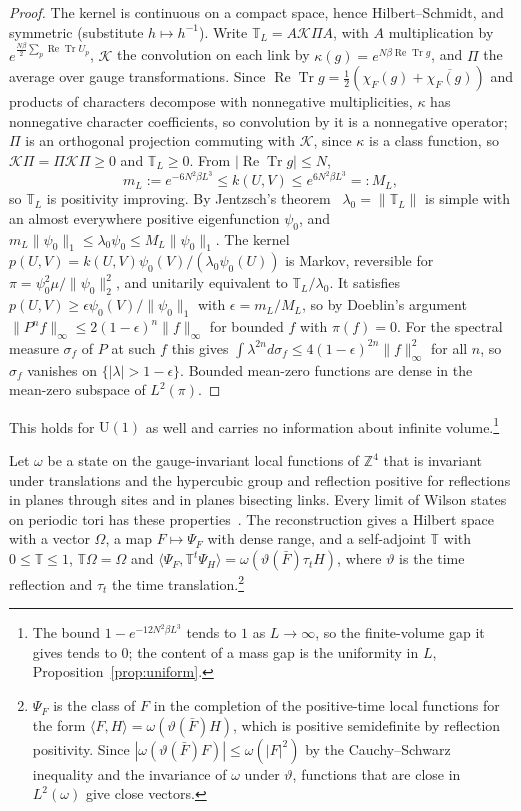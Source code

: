 \documentclass[aps,prd,twocolumn,superscriptaddress,nofootinbib,longbibliography,floatfix,amsmath,amssymb,10pt]{revtex4-2}
\theoremstyle{definition}
\theoremstyle{remark}
\newcommand{\Z}{\mathbb{Z}}
\newcommand{\U}{\mathrm{U}}
\newcommand{\ReTr}{\operatorname{Re}\operatorname{Tr}}
\newcommand{\ip}[2]{\langle #1,#2\rangle}
\begin{document}
\begin{proof}
The kernel is continuous on a compact space, hence Hilbert--Schmidt, and
symmetric (substitute $h\mapsto h^{-1}$). Write $\mathbb T_L=A\mathcal K\Pi A$,
with $A$ multiplication by $e^{\frac{N\beta}2\sum_p\ReTr U_p}$, $\mathcal K$
the convolution on each link by $\kappa(g)=e^{N\beta\ReTr g}$, and $\Pi$ the
average over gauge transformations. Since $\ReTr g=\frac12(\chi_F(g)+
\overline{\chi_F(g)})$ and products of characters decompose with nonnegative
multiplicities, $\kappa$ has nonnegative character coefficients, so convolution
by it is a nonnegative operator; $\Pi$ is an orthogonal projection commuting
with $\mathcal K$, since $\kappa$ is a class function, so $\mathcal K\Pi=
\Pi\mathcal K\Pi\ge0$ and $\mathbb T_L\ge0$. From $|\ReTr g|\le N$,
\[
m_L:=e^{-6N^2\beta L^3}\le k(U,V)\le e^{6N^2\beta L^3}=:M_L,
\]
so $\mathbb T_L$ is positivity improving. By Jentzsch's
theorem~\cite{Jen12} $\lambda_0=\|\mathbb T_L\|$ is simple with an almost
everywhere positive eigenfunction $\psi_0$, and
$m_L\|\psi_0\|_1\le\lambda_0\psi_0\le M_L\|\psi_0\|_1$. The kernel
$p(U,V)=k(U,V)\psi_0(V)/(\lambda_0\psi_0(U))$ is Markov, reversible for
$\pi=\psi_0^2\mu/\|\psi_0\|_2^2$, and unitarily equivalent to
$\mathbb T_L/\lambda_0$. It satisfies $p(U,V)\ge\epsilon\psi_0(V)/
\|\psi_0\|_1$ with $\epsilon=m_L/M_L$, so by Doeblin's argument
$\|P^nf\|_\infty\le2(1-\epsilon)^n\|f\|_\infty$ for bounded $f$ with $\pi(f)=0$.
For the spectral measure $\sigma_f$ of $P$ at such $f$ this gives
$\int\lambda^{2n}d\sigma_f\le4(1-\epsilon)^{2n}\|f\|_\infty^2$ for all $n$, so
$\sigma_f$ vanishes on $\{|\lambda|>1-\epsilon\}$. Bounded mean-zero functions
are dense in the mean-zero subspace of $L^2(\pi)$.
\end{proof}

This holds for $\U(1)$ as well and carries no information about infinite
volume.\footnote{The bound $1-e^{-12N^2\beta L^3}$ tends to $1$ as
$L\to\infty$, so the finite-volume gap it gives tends to $0$; the content of a
mass gap is the uniformity in $L$, Proposition~\ref{prop:uniform}.}

Let $\omega$ be a state on the gauge-invariant local functions of $\Z^4$ that
is invariant under translations and the hypercubic group and reflection
positive for reflections in planes through sites and in planes bisecting
links. Every limit of Wilson states on periodic tori has these
properties~\cite{OSei78}. The reconstruction gives a Hilbert space with a
vector $\Omega$, a map $F\mapsto\Psi_F$ with dense range, and a self-adjoint
$\mathbb T$ with $0\le\mathbb T\le1$, $\mathbb T\Omega=\Omega$ and
$\ip{\Psi_F}{\mathbb T^t\Psi_H}=\omega(\vartheta(\bar F)\tau_tH)$, where
$\vartheta$ is the time reflection and $\tau_t$ the time
translation.\footnote{$\Psi_F$ is the class of $F$ in the completion of the
positive-time local functions for the form $\ip FH=\omega(\vartheta(\bar F)H)$,
which is positive semidefinite by reflection positivity. Since
$|\omega(\vartheta(\bar F)F)|\le\omega(|F|^2)$ by the Cauchy--Schwarz
inequality and the invariance of $\omega$ under $\vartheta$, functions that are
close in $L^2(\omega)$ give close vectors.}
\end{document}
